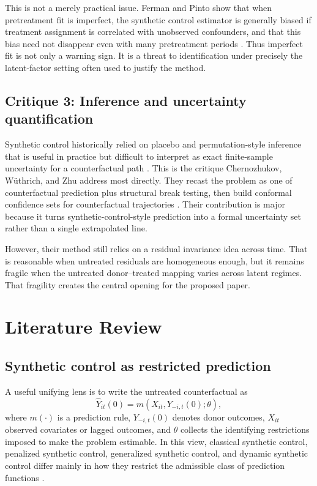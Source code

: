 \documentclass[11pt]{article}
\begin{document}
This is not a merely practical issue. Ferman and Pinto show that when pretreatment fit is imperfect, the synthetic control estimator is generally biased if treatment assignment is correlated with unobserved confounders, and that this bias need not disappear even with many pretreatment periods \citep{Ferman2021}. Thus imperfect fit is not only a warning sign. It is a threat to identification under precisely the latent-factor setting often used to justify the method.

\subsection{Critique 3: Inference and uncertainty quantification}

Synthetic control historically relied on placebo and permutation-style inference that is useful in practice but difficult to interpret as exact finite-sample uncertainty for a counterfactual path \citep{Abadie2010,Hahn2018,FirpoPossebom2018}. This is the critique Chernozhukov, W\"uthrich, and Zhu address most directly. They recast the problem as one of counterfactual prediction plus structural break testing, then build conformal confidence sets for counterfactual trajectories \citep{Chernozhukov2021}. Their contribution is major because it turns synthetic-control-style prediction into a formal uncertainty set rather than a single extrapolated line.

However, their method still relies on a residual invariance idea across time. That is reasonable when untreated residuals are homogeneous enough, but it remains fragile when the untreated donor--treated mapping varies across latent regimes. That fragility creates the central opening for the proposed paper.

\section{Literature Review}

\subsection{Synthetic control as restricted prediction}

A useful unifying lens is to write the untreated counterfactual as
\[
\widehat{Y}_{it}(0)=m(X_{it},Y_{-i,t}(0);\theta),
\]
where $m(\cdot)$ is a prediction rule, $Y_{-i,t}(0)$ denotes donor outcomes, $X_{it}$ observed covariates or lagged outcomes, and $\theta$ collects the identifying restrictions imposed to make the problem estimable. In this view, classical synthetic control, penalized synthetic control, generalized synthetic control, and dynamic synthetic control differ mainly in how they restrict the admissible class of prediction functions \citep{Abadie2010,AbadieLHour2021,Xu2017,Cao2025}.
\end{document}
